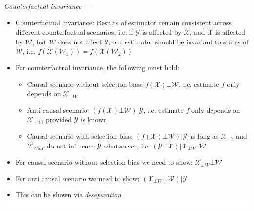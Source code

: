 \emph{Counterfactual invariance} --- 
\begin{itemize}
    \item Counterfactual invariance: Results of estimator remain consistent across different counterfactual scenarios, i.e. if $\mathcal{Y}$ is affected by $\mathcal{X}$, and $\mathcal{X}$ is affected by $\mathcal{W}$, but $\mathcal{W}$ does not affect $\mathcal{Y}$, our estimator should be invariant to states of $\mathcal{W}$, i.e. $f(\mathcal{X}(\mathcal{W}_1)) = f(\mathcal{X}(\mathcal{W}_2))$
    \item For counterfactual invariance, the following must hold:
    \begin{itemize}
        \item Causal scenario without selection bias: $f(\mathcal{X}) \bot \mathcal{W}$, i.e. estimate $f$ only depends on $\mathcal{X}_{\bot W}$
        \item Anti causal scenario: $(f(\mathcal{X}) \bot \mathcal{W}) | \mathcal{Y}$, i.e. estimate $f$ only depends on $\mathcal{X}_{\bot W}$, provided $\mathcal{Y}$ is known
        \item Causal scenario with selection bias: $(f(\mathcal{X}) \bot \mathcal{W}) | \mathcal{Y}$ as long as $\mathcal{X}_{\bot Y}$ and $\mathcal{X}_{W \& Y}$ do not influence $\mathcal{Y}$ whatsoever, i.e. $(\mathcal{Y} \bot \mathcal{X}) | \mathcal{X}_{\bot W}, \mathcal{W}$
    \end{itemize}
    \item For causal scenario without selection bias we need to show: $\mathcal{X}_{\bot W} \bot \mathcal{W}$
    \item For anti causal scenario we need to show: $(\mathcal{X}_{\bot W} \bot \mathcal{W}) | \mathcal{Y}$
    \item This can be shown via \emph{d-separation}
\end{itemize}

{\color{lightgray}\hrule height 0.001mm}

